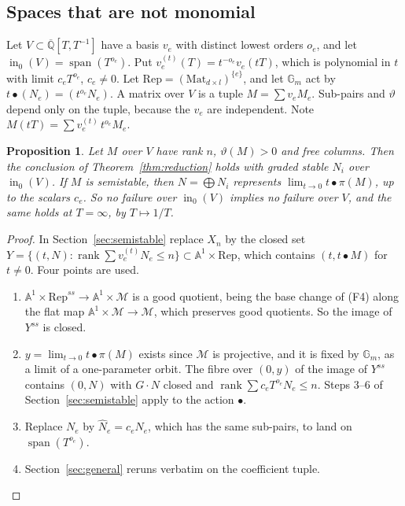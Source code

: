 \documentclass[11pt,a4paper]{article}
\theoremstyle{plain}
\newtheorem{proposition}[lemma]{Proposition}
\theoremstyle{definition}
\newcommand{\Qbar}{\overline{\mathbb{Q}}}
\newcommand{\spn}{\operatorname{span}}
\newcommand{\rk}{\operatorname{rank}}
\newcommand{\Gm}{\mathbb{G}_{m}}
\newcommand{\Aff}{\mathbb{A}^{1}}
\newcommand{\Rep}{\mathrm{Rep}}
\newcommand{\Mm}{\mathcal{M}}
\newcommand{\vth}{\vartheta}
\newcommand{\In}{\operatorname{in}}
\begin{document}
\subsection{Spaces that are not monomial}\label{sec:nonmonomial}

Let $V\subset\Qbar[T,T^{-1}]$ have a basis $v_{e}$ with distinct lowest orders $o_{e}$, and let $\In_{0}(V)=\spn(T^{o_{e}})$. Put $v_{e}^{(t)}(T)=t^{-o_{e}}v_{e}(tT)$, which is polynomial in $t$ with limit $c_{e}T^{o_{e}}$, $c_{e}\neq0$. Let
$\Rep=(\mathrm{Mat}_{d\times l})^{\{e\}}$, and let $\Gm$ act by $t\bullet(N_{e})=(t^{o_{e}}N_{e})$. A matrix over $V$ is a tuple $M=\sum v_{e}M_{e}$. Sub-pairs and $\vth$ depend only on the tuple, because the $v_{e}$ are independent. Note
$M(tT)=\sum v_{e}^{(t)}\,t^{o_{e}}M_{e}$.

\begin{proposition}\label{prop:nonmonomial}
Let $M$ over $V$ have rank $n$, $\vth(M)>0$ and free columns. Then the conclusion of Theorem~\ref{thm:reduction} holds with graded stable $N_{i}$ over $\In_{0}(V)$. If $M$ is semistable, then $N=\bigoplus N_{i}$ represents
$\lim_{t\to0}t\bullet\pi(M)$, up to the scalars $c_{e}$. So no failure over $\In_{0}(V)$ implies no failure over $V$, and the same holds at $T=\infty$, by $T\mapsto1/T$.
\end{proposition}

\begin{proof}
In Section~\ref{sec:semistable} replace $X_{n}$ by the closed set $Y=\{(t,N):\rk\sum v_{e}^{(t)}N_{e}\le n\}\subset\Aff\times\Rep$, which contains $(t,t\bullet M)$ for $t\neq0$. Four points are used.
\begin{enumerate}[label=(\arabic*)]
\item $\Aff\times\Rep^{ss}\to\Aff\times\Mm$ is a good quotient, being the base change of (F4) along the flat map $\Aff\times\Mm\to\Mm$, which preserves good quotients. So the image of $Y^{ss}$ is closed.
\item $y=\lim_{t\to0}t\bullet\pi(M)$ exists since $\Mm$ is projective, and it is fixed by $\Gm$, as a limit of a one-parameter orbit. The fibre over $(0,y)$ of the image of $Y^{ss}$ contains $(0,N)$ with $G\cdot N$ closed and
$\rk\sum c_{e}T^{o_{e}}N_{e}\le n$. Steps 3--6 of Section~\ref{sec:semistable} apply to the action $\bullet$.
\item Replace $N_{e}$ by $\hat N_{e}=c_{e}N_{e}$, which has the same sub-pairs, to land on $\spn(T^{o_{e}})$.
\item Section~\ref{sec:general} reruns verbatim on the coefficient tuple. \qedhere
\end{enumerate}
\end{proof}
\end{document}
